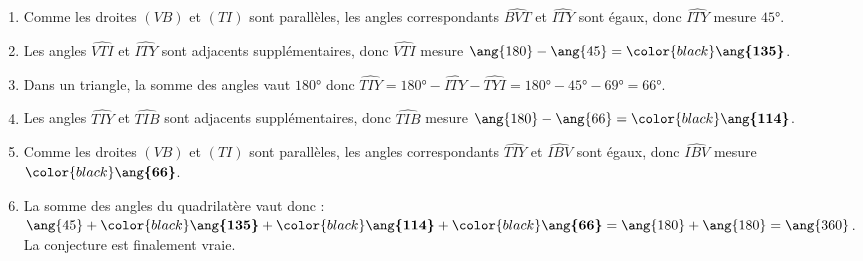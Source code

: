 \begin{corrige}
   \begin{enumerate}
      \item Comme les droites $(VB)$ et $(TI)$ sont parallèles, les angles correspondants $\widehat{BVT}$ et $\widehat{ITY}$ sont égaux, donc $\widehat{ITY}$ mesure $\ang{45}$.\\
      \item Les angles $\widehat{VTI}$ et $\widehat{ITY}$ sont adjacents supplémentaires, donc $\widehat{VTI}$ mesure $\ang{180}-\ang{45}={\color{black}\boldsymbol{\ang{135}}}$.\\
      \item Dans un triangle, la somme des angles vaut $\ang{180}$ donc $\widehat{TIY}=\ang{180}-\widehat{ITY}-\widehat{TYI}=\ang{180}-\ang{45}-\ang{69}=\ang{66}$.\\
      \item Les angles $\widehat{TIY}$ et $\widehat{TIB}$ sont adjacents supplémentaires, donc $\widehat{TIB}$ mesure $\ang{180}-\ang{66}={\color{black}\boldsymbol{\ang{114}}}$.\\
      \item Comme les droites $(VB)$ et $(TI)$ sont parallèles, les angles correspondants $\widehat{TIY}$ et $\widehat{IBV}$ sont égaux, donc $\widehat{IBV}$ mesure ${\color{black}\boldsymbol{\ang{66}}}$.\\
      \item La somme des angles du quadrilatère vaut donc : $\ang{45}+{\color{black}\boldsymbol{\ang{135}}}+{\color{black}\boldsymbol{\ang{114}}}+{\color{black}\boldsymbol{\ang{66}}}=\ang{180}+\ang{180}=\ang{360}$.\\
      La conjecture est finalement vraie.
   \end{enumerate}
\end{corrige}